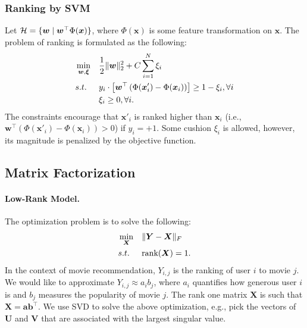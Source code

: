 {    \subsubsection{Ranking by SVM}
        Let $\mathcal{H}=\{ \bm{w} \mid \bm{w}^\top \Phi(\bm{x}) \}$, where $\Phi(\bm{x})$ is some feature transformation on $\bm{x}$.
        The problem of ranking is formulated as the following:
            \begin{equation}
                \begin{aligned}
                    & \min_{\bm{w}, \bm{\xi}} & & \frac{1}{2}\lVert\bm{w}\rVert_2^2 + C \sum_{i=1}^{N}{\xi_i} \\
                    & s.t. & & y_i \cdot \left[ \bm{w}^\top \left( \Phi(\bm{x}'_i) - \Phi(\bm{x}_i) \right) \right] \ge 1 - \xi_i, \forall i \\
                    & & & \xi_i \ge 0, \forall i.
                \end{aligned}
            \end{equation}
        The constraints encourage that $\bm{x}'_i$ is ranked higher than $\bm{x}_i$ (i.e., $\bm{w}^\top \left( \Phi(\bm{x}'_i) - \Phi(\bm{x}_i) \right) > 0$) if $y_i=+1$.
        Some cushion $\xi_i$ is allowed, however, its magnitude is penalized by the objective function.


\subsection{Matrix Factorization}
        \paragraph{Low-Rank Model.} 
        The optimization problem is to solve the following:
            \begin{equation}
                \begin{aligned}
                            & \min_{\bm{X}}  & & \lVert\bm{Y} - \bm{X}\rVert_F \\
                            & s.t. & & \text{rank}(\bm{X}) = 1.
                \end{aligned}
            \end{equation}
        In the context of movie recommendation, $Y_{i,j}$ is the ranking of user $i$ to movie $j$.
        We would like to approximate $Y_{i,j} \approx a_i b_j$, where $a_i$ quantifies how generous user $i$ is and $b_j$ measures the  popularity of movie $j$.
        The rank one matrix $\bm{X}$ is such that $\bm{X}=\bm{a}\bm{b}^\top$.
        We use SVD to solve the above optimization, e.g., pick the vectors of $\bm{U}$ and $\bm{V}$ that are associated with the largest singular value.

}

